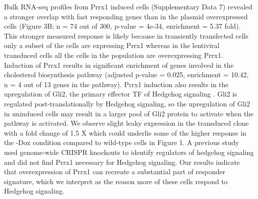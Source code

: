 Bulk RNA-seq profiles from Prrx1 induced cells (Supplementary Data 7) revealed a stronger overlap with fast responding genes than in the plasmid overexpressed cells (Figure 3B; n = 74 out of 300, p-value = 4e-34, enrichment = 5.37 fold). This stronger measured response is likely because in transiently transfected cells only a subset of the cells are expressing Prrx1 whereas in the lentiviral transduced cells all the cells in the population are overexpressing Prrx1. Induction of Prrx1 results in significant enrichment of genes involved in the cholesterol biosynthesis pathway (adjusted p-value = 0.025, enrichment = 10.42, n = 4 out of 13 genes in the pathway). Prrx1 induction also results in the upregulation of Gli2, the primary effector TF of Hedgehog signaling \cite{Kong2019-wo,Briscoe2013-ze,Lee2016-bf}. Gli2 is regulated post-translationally by Hedgehog signaling, so the upregulation of Gli2 in uninduced cells may result in a larger pool of Gli2 protein to activate when the pathway is activated. We observe slight leaky expression in the transduced clone with a fold change of 1.5 X which could underlie some of the higher response in the -Dox condition compared to wild-type cells in Figure 1. A previous study used genome-wide CRISPR knockouts \cite{Pusapati2018-gs} to identify regulators of hedgehog signaling and did not find Prrx1 necessary for Hedgehog signaling. Our results indicate that overexpression of Prrx1 can recreate a substantial part of responder signature, which we interpret as the reason more of these cells respond to Hedgehog signaling.

